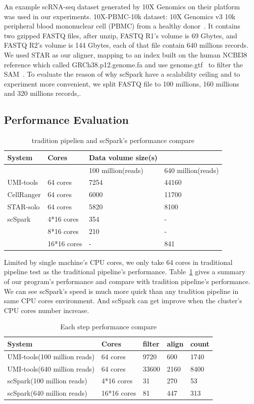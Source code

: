 \documentclass[runningheads]{llncs}
\begin{document}
An example scRNA-seq dataset generated by 10X Genomics on their platform was used in our experiments.
10X-PBMC-10k dataset: 10X Genomics v3 10k peripheral blood mononuclear cell (PBMC) from a healthy donor~\cite{ref_url4}. 
It contains two gzipped FASTQ files, after unzip, FASTQ R1's volume is 69 Gbytes, and FASTQ R2's volume is 144 Gbytes, each of that file contain 640 millions records.
We used STAR as our aligner, mapping to an index built on the human NCBI38 reference which called GRCh38.p12.genome.fa and use genome.gtf~\cite{ref_url5} to filter the SAM~\cite{ref_url5}.
To evaluate the reason of why scSpark have a scalability ceiling and to experiment more convenient, we split FASTQ file to 100 millions, 160 millions and 320 millions records,.
\subsection{Performance Evaluation}
\begin{table}
  \centering
  \caption{tradition pipelien and scSpark's performance compare}\label{tab1}
  \begin{tabular}{l | l | l  l}
  \hline
  System &  Cores & Data volume size(s) \\
  \hline
   &  & 100 million(reads) & 640 million(reads) \\
  \hline
  UMI-tools & 64 cores & 7254 & 44160 \\
  \hline
  CellRanger & 64 cores & 6000 & 11700 \\
  \hline
  STAR-solo & 64 cores &  5820 & 8100 \\
  \hline
  scSpark & 4*16 cores & 354 & - \\
   & 8*16 cores & 210 & - \\
   & 16*16 cores & - & 841 \\
  \hline
  \end{tabular}
\end{table}
Limited by single machine's CPU cores, we only take 64 cores in traditional pipeline test as the traditional pipeline's performance.
Table~\ref{tab1} gives a summary of our program's performance and compare with tradition pipeline's performance.
We can see scSpark's speed is much more quick than any tradition pipeline in same CPU cores environment.
And scSpark can get improve when the cluster's CPU cores number increase.
\begin{table}
  \centering
  \caption{Each step performance compare}\label{tab2}
  \begin{tabular}{l | l | l | l | l}
  \hline
  System & Cores & filter & align & count \\
  \hline
  UMI-tools(100 million reads) & 64 cores & 9720 & 600 & 1740 \\
  \hline
  UMI-tools(640 million reads) & 64 cores & 33600 & 2160 & 8400 \\
  \hline
  scSpark(100 million reads) & 4*16 cores & 31 & 270 & 53 \\
  \hline
  scSpark(640 million reads) & 16*16 cores & 81 & 447 & 313 \\
  \hline
  \end{tabular}
\end{table}
\end{document}
